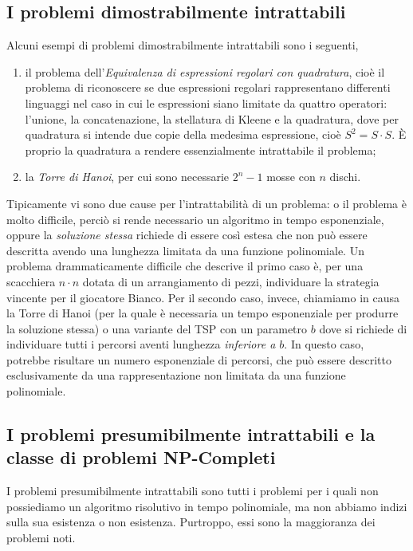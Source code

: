 \documentclass[10pt]{\classname}
\theoremstyle{newlinethm}
\theoremstyle{theorem}
\theoremstyle{definition}
\theoremstyle{definition}
\theoremstyle{definition}
\theoremstyle{definition}
\begin{document}
\subsection{I problemi dimostrabilmente intrattabili}
Alcuni esempi di problemi dimostrabilmente intrattabili sono i seguenti,
\begin{enumerate}
    \item il problema dell'\emph{Equivalenza di espressioni regolari con quadratura}, cioè il problema di riconoscere se due espressioni regolari rappresentano differenti linguaggi nel caso in cui le espressioni siano limitate da quattro operatori: l'unione, la concatenazione, la stellatura di Kleene e la quadratura, dove per quadratura si intende due copie della medesima espressione, cioè $S^2 = S\cdot S$. È proprio la quadratura a rendere essenzialmente intrattabile il problema;
    \item la \emph{Torre di Hanoi}, per cui sono necessarie $2^n - 1$ mosse con $n$ dischi.
\end{enumerate}
Tipicamente vi sono due cause per l'intrattabilità di un problema: o il problema è molto difficile, perciò si rende necessario un algoritmo in tempo esponenziale, oppure la \emph{soluzione stessa} richiede di essere così estesa che non può essere descritta avendo una lunghezza limitata da una funzione polinomiale. Un problema drammaticamente difficile che descrive il primo caso è, per una scacchiera $n\cdot n$ dotata di un arrangiamento di pezzi, individuare la strategia vincente per il giocatore Bianco. Per il secondo caso, invece, chiamiamo in causa la Torre di Hanoi (per la quale è necessaria un tempo esponenziale per produrre la soluzione stessa) o una variante del TSP con un parametro $b$ dove si richiede di individuare tutti i percorsi aventi lunghezza \emph{inferiore a $b$}. In questo caso, potrebbe risultare un numero esponenziale di percorsi, che può essere descritto esclusivamente da una rappresentazione non limitata da una funzione polinomiale.

\subsection{I problemi presumibilmente intrattabili e la classe di problemi NP-Completi}
I problemi presumibilmente intrattabili sono tutti i problemi per i quali non possiediamo un algoritmo risolutivo in tempo polinomiale, ma non abbiamo indizi sulla sua esistenza o non esistenza. Purtroppo, essi sono la maggioranza dei problemi noti.
\end{document}
